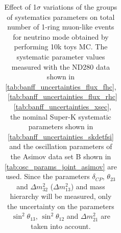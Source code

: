 \begin{table}[htb]
\begin{tabular}{| c | c | c |}
\end{tabular}
\caption{
 Effect of 1$\sigma$ variations of the groups of systematics parameters on total number of
 1-ring muon-like events for neutrino mode obtained by performing 10k toys MC.
The systematic parameter values measured with the ND280 data 
shown in 
\cref{tab:banff_uncertainties_flux_fhc},
~\ref{tab:banff_uncertainties_flux_rhc}
~\ref{tab:banff_uncertainties_xsec},
the nominal Super-K systematic parameters shown in \cref{tab:banff_uncertainties_skdetfsi}
and the oscillation parameters of the Asimov data set B shown in \cref{tab:osc_params_joint_asimov}
are used.
Since the parameters $\delta_{CP}$, $\theta_{23}$ and $\Delta m^2_{32}$ ($\Delta m^2_{13}$) and mass hierarchy
will be measured,
only the uncertainty on the parameters 
$\sin^2 \theta_{13}$,
$\sin^2 \theta_{12}$
and 
$\Delta m^2_{21}$ 
are taken into account.
}                                                                                                                                                                                          
\label{tab:nsk_systematic_table_summary_joint_asimov_B_fhc_mulike_Run17b}
\end{table}






